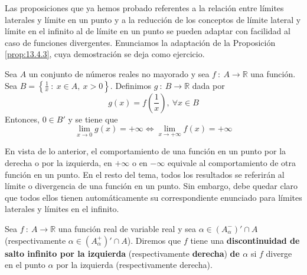 Las proposiciones que ya hemos probado referentes a la relación entre límites laterales y límite en un punto y a la reducción de los conceptos de límite lateral y límite en el infinito al de límite en un punto se pueden adaptar con facilidad al caso de funciones divergentes. Enunciamos la adaptación de la Proposición \ref{prop:13.4.3}, cuya demostración se deja como ejercicio.
\begin{prop}
    Sea $A$ un conjunto de números reales no mayorado y sea $f ~:~ A \longrightarrow \mathbb{R}$ una función.
    Sea $B = \left\{ \frac{1}{x} ~:~ x \in A, ~ x > 0 \right\}$. Definimos $g ~:~ B \longrightarrow \mathbb{R}$ dada por
    \begin{equation*}
        g(x) = f\left(\frac{1}{x}\right), ~ \forall x \in B
    \end{equation*}
    Entonces, $0 \in B'$ y se tiene que
    \begin{equation*}
        \displaystyle\lim_{x \to 0} g(x) = + \infty \Longleftrightarrow \displaystyle\lim_{x \to + \infty} f(x) = + \infty
    \end{equation*}
\end{prop}

En vista de lo anterior, el comportamiento de una función en un punto por la derecha o por la izquierda, en $+ \infty$ o en $- \infty$ equivale al comportamiento de otra función en un punto. En el resto del tema, todos los resultados se referirán al límite o divergencia de una función en un punto. Sin embargo, debe quedar claro que todos ellos tienen automáticamente su correspondiente enunciado para límites laterales y límites en el infinito.

\begin{definicion}
    Sea $f ~:~ A \longrightarrow \mathbb{R}$ una función real de variable real y sea $\alpha \in (A_{\alpha}^{-})' \cap A$ (respectivamente $\alpha \in (A_{\alpha}^{+})' \cap A$). Diremos
    que $f$ tiene una \textbf{discontinuidad de salto infinito por la izquierda} (respectivamente \textbf{derecha})
    \textbf{de $\alpha$} si $f$ diverge en el punto $\alpha$ por la izquierda (respectivamente derecha).
\end{definicion}


\newpage

